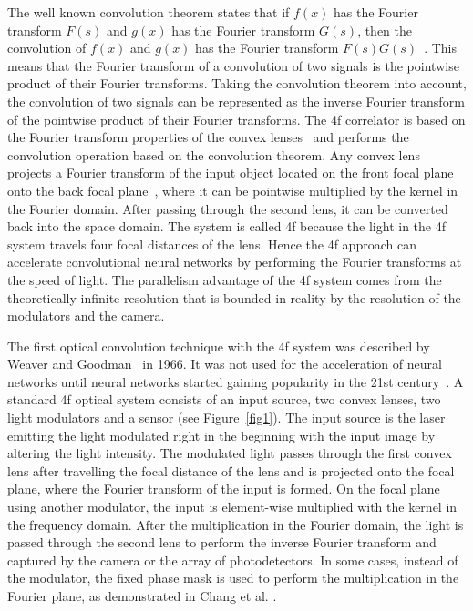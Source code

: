 \documentclass{article}
\begin{document}
The well known convolution theorem states that if $f(x)$ has the Fourier transform $F(s)$ and $g(x)$ has the Fourier transform $G(s)$, then the convolution of $f(x)$ and $g(x)$ has the Fourier transform $F(s)G(s)$~\cite{bracewell_fourier_2000}. This means that the Fourier transform of a convolution of two signals is the pointwise product of their Fourier transforms. Taking the convolution theorem into account, the convolution of two signals can be represented as the inverse Fourier transform of the pointwise product of their Fourier transforms. The 4f correlator is based on the Fourier transform properties of the convex lenses~\cite{culshaw_fourier_2020} and performs the convolution operation based on the convolution theorem. Any convex lens projects a Fourier transform of the input object located on the front focal plane onto the back focal plane~\cite{culshaw_fourier_2020}, where it can be pointwise multiplied by the kernel in the Fourier domain. After passing through the second lens, it can be converted back into the space domain. The system is called 4f because the light in the 4f system travels four focal distances of the lens. Hence the 4f approach can accelerate convolutional neural networks by performing the Fourier transforms at the speed of light. The parallelism advantage of the 4f system comes from the theoretically infinite resolution that is bounded in reality by the resolution of the modulators and the camera. 

The first optical convolution technique with the 4f system was described by Weaver and Goodman~\cite{weaver_technique_1966} in 1966. It was not used for the acceleration of neural networks until neural networks started gaining popularity in the 21st century~\cite{jutamulia_overview_1996}. A standard 4f optical system consists of an input source, two convex lenses, two light modulators and a sensor (see Figure~\ref{fig1}). The input source is the laser emitting the light modulated right in the beginning with the input image by altering the light intensity. The modulated light passes through the first convex lens after travelling the focal distance of the lens and is projected onto the focal plane, where the Fourier transform of the input is formed. On the focal plane using another modulator, the input is element-wise multiplied with the kernel in the frequency domain. After the multiplication in the Fourier domain, the light is passed through the second lens to perform the inverse Fourier transform and captured by the camera or the array of photodetectors. In some cases, instead of the modulator, the fixed phase mask is used to perform the multiplication in the Fourier plane, as demonstrated in Chang et al. \cite{chang_hybrid_2018}. 
\end{document}
